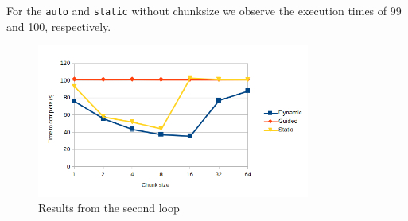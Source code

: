 \documentclass[11pt,a4paper]{article}
\begin{document}
For the \texttt{auto} and \texttt{static} without chunksize we observe the execution times of 99 and 100, respectively.

\begin{figure}[h!]
    \begin{center}
        \includegraphics[width=0.8\textwidth]{loop2.png}
    \end{center}
    \caption{Results from the second loop}
\end{figure}
\end{document}
